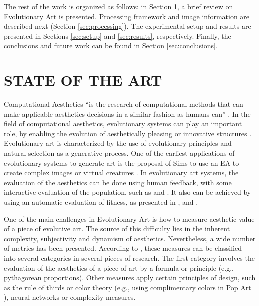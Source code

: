 \documentclass[a4paper,twoside]{article}
\begin{document}

The rest of the work is organized as follows: in Section \ref{sec:soa}, a brief review on Evolutionary Art is presented. Processing framework and image information are described next (Section \ref{sec:processing}). The experimental setup and results are presented in Sections \ref{sec:setup} and \ref{sec:results}, respectively. Finally, the conclusions and future work can be found in Section \ref{sec:conclusions}.

\section{\uppercase{STATE OF THE ART}}
\label{sec:soa}
\noindent Computational Aesthetics ``is the research of computational methods that can make applicable aesthetics decisions in a similar fashion as humans can'' \cite{COMPAESTH}. In the field of computational aesthetics, evolutionary systems can play an important role, by enabling the evolution of aesthetically pleasing or innovative structures \cite{dipaola2009incorporating}. Evolutionary art is characterized by the use of evolutionary principles and natural selection as a generative process. One of the earliest applications of evolutionary systems to generate art is the proposal of Sims to use an EA to create complex images \cite{sims1991artificial} or virtual creatures  \cite{sims1994evolving}. In evolutionary art systems, the evaluation of the aesthetics can be done using human feedback, with some interactive evaluation of the population, such as \cite{ashlock2006evolutionary,draves2006electric,moroni2000vox} and \cite{sims1991artificial}. It also can be achieved by using an automatic evaluation of fitness, as presented in \cite{aguilar2008robotic,den2010comparing,dipaola2009incorporating,li2012investigating}, and \cite{sims1994evolving}.

One of the main challenges in Evolutionary Art is how to measure aesthetic value of a piece of evolutive art. The source of this difficulty lies in the inherent complexity, subjectivity and dynamism of aesthetics. Nevertheless, a wide number of metrics has been presented. According to \cite{galanter2012computational}, these measures can be classified into several categories in several pieces of research. The first category involves the evaluation of the aesthetics of a piece of art by a formula or principle (e.g., pythagorean proportions). Other measures apply certain principles of design, such as the rule of thirds or color theory (e.g., using complimentary colors in Pop Art \cite{den2012evolving}), neural networks or complexity measures. 
\end{document}
